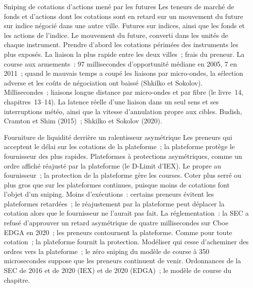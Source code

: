 \begin{strategyfile}{Sniping de cotations d'actions mené par les futures}\label{strat:hf:latency-arbitrage-and-its-defence:futures}
 Les teneurs de marché de fonds et d'actions dont les cotations sont en retard sur un mouvement du future sur indice négocié dans une autre ville.
 Futures sur indices, ainsi que les fonds et les actions de l'indice.
 Le mouvement du future, converti dans les unités de chaque instrument.
 Prendre d'abord les cotations périmées des instruments les plus exposés.
 La liaison la plus rapide entre les deux villes~; frais du preneur.
 La course aux armements~: 97 millisecondes d'opportunité médiane en 2005, 7 en 2011~; quand le mauvais temps a coupé les liaisons par micro-ondes, la sélection adverse
et les coûts de négociation ont baissé (Shkilko et Sokolov).
 Millisecondes~; liaisons longue distance par micro-ondes et par fibre (le livre~14, chapitres~13--14).
 La latence réelle d'une liaison dans un seul sens et ses interruptions météo, ainsi que la vitesse d'annulation propre aux cibles.
 Budish, Cramton et Shim (2015)~; Shkilko et Sokolov (2020).
\end{strategyfile}

\begin{strategyfile}{Fourniture de liquidité derrière un ralentisseur asymétrique}\label{strat:hf:latency-arbitrage-and-its-defence:bump}
 Les preneurs qui acceptent le délai sur les cotations de la plateforme~; la plateforme protège le fournisseur des plus rapides.
 Plateformes à protections asymétriques, comme un ordre affiché réajusté par la plateforme (le D-Limit d'IEX).
 Le  propre au fournisseur~; la protection de la plateforme gère les courses.
 Coter plus serré ou plus gros que sur les plateformes continues, puisque moins de cotations font l'objet d'un sniping.
 Moins d'exécutions~: certains preneurs évitent les plateformes retardées~; le réajustement par la plateforme peut déplacer la cotation alors que le fournisseur ne l'aurait pas fait.
 La réglementation~: la SEC a refusé d'approuver un retard asymétrique de quatre millisecondes sur Cboe EDGA en 2020~; les preneurs contournent la plateforme.
 Comme pour toute cotation~; la plateforme fournit la protection.
 Modéliser qui cesse d'acheminer des ordres vers la plateforme~; le zéro sniping du modèle de course à 350 microsecondes suppose que les preneurs continuent de venir.
 Ordonnances de la SEC de 2016 et de 2020 (IEX) et de 2020 (EDGA)~; le modèle de course du chapitre.
\end{strategyfile}

